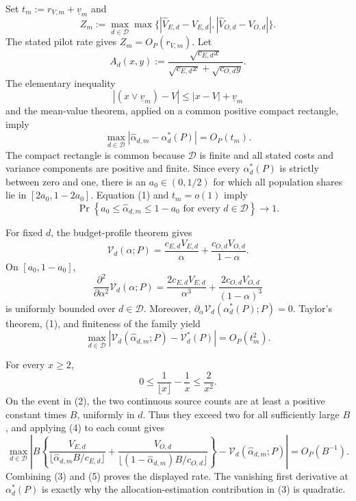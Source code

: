 Set \(t_m:=r_{V,m}+\underline v_m\) and
\[
 Z_m:=\max_{d\in\mathcal D}\max\bigl\{
 |\widehat V_{E,d}-V_{E,d}|,
 |\widehat V_{O,d}-V_{O,d}|\bigr\}.
\]
The stated pilot rate gives \(Z_m=O_P(r_{V,m})\).  Let
\[
 A_d(x,y):=
 \frac{\sqrt{c_{E,d}x}}
 {\sqrt{c_{E,d}x}+\sqrt{c_{O,d}y}}.
\]
The elementary inequality
\[
 |(x\vee\underline v_m)-V|
 \le |x-V|+\underline v_m
\]
and the mean-value theorem, applied on a common positive compact rectangle, imply
\[
 \max_{d\in\mathcal D}
 |\widehat\alpha_{d,m}-\alpha_d^*(P)|=O_P(t_m).                            \tag{1}
\]
The compact rectangle is common because \(\mathcal D\) is finite and all stated costs and variance components are positive and finite.  Since every \(\alpha_d^*(P)\) is strictly between zero and one, there is an \(a_0\in(0,1/2)\) for which all population shares lie in \([2a_0,1-2a_0]\).  Equation (1) and \(t_m=o(1)\) imply
\[
 \Pr\!\left\{a_0\le\widehat\alpha_{d,m}\le1-a_0
       \text{ for every }d\in\mathcal D\right\}\longrightarrow1.       \tag{2}
\]

For fixed \(d\), the budget-profile theorem gives
\[
 \mathcal V_d(\alpha;P)
 =\frac{c_{E,d}V_{E,d}}{\alpha}
  +\frac{c_{O,d}V_{O,d}}{1-\alpha}.
\]
On \([a_0,1-a_0]\),
\[
 \frac{\partial^2}{\partial\alpha^2}\mathcal V_d(\alpha;P)
 =\frac{2c_{E,d}V_{E,d}}{\alpha^3}
  +\frac{2c_{O,d}V_{O,d}}{(1-\alpha)^3}
\]
is uniformly bounded over \(d\in\mathcal D\).  Moreover,
\(\partial_\alpha\mathcal V_d(\alpha_d^*(P);P)=0\).  Taylor's theorem, (1), and finiteness of the family yield
\[
 \max_{d\in\mathcal D}
 \left|\mathcal V_d(\widehat\alpha_{d,m};P)-\mathcal V_d^*(P)\right|
 =O_P(t_m^2).                                                               \tag{3}
\]

For every \(x\ge2\),
\[
 0\le \frac1{\lfloor x\rfloor}-\frac1x
 \le\frac2{x^2}.                                                          \tag{4}
\]
On the event in (2), the two continuous source counts are at least a positive constant times \(B\), uniformly in \(d\).  Thus they exceed two for all sufficiently large \(B\), and applying (4) to each count gives
\[
 \max_{d\in\mathcal D}\left|
 B\left\{
 \frac{V_{E,d}}{\lfloor\widehat\alpha_{d,m}B/c_{E,d}\rfloor}
 +\frac{V_{O,d}}{\lfloor(1-\widehat\alpha_{d,m})B/c_{O,d}\rfloor}
 \right\}
 -\mathcal V_d(\widehat\alpha_{d,m};P)
 \right|=O_P(B^{-1}).                                                       \tag{5}
\]
Combining (3) and (5) proves the displayed rate.  The vanishing first derivative at \(\alpha_d^*(P)\) is exactly why the allocation-estimation contribution in (3) is quadratic.